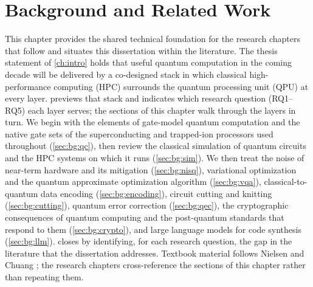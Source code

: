 \chapter{Background and Related Work}\label{ch:background}


This chapter provides the shared technical foundation for the research chapters that follow and situates this dissertation within the literature. The thesis statement of \cref{ch:intro} holds that useful quantum computation in the coming decade will be delivered by a co-designed stack in which classical high-performance computing (HPC) surrounds the quantum processing unit (QPU) at every layer.  previews that stack and indicates which research question (RQ1--RQ5) each layer serves; the sections of this chapter walk through the layers in turn. We begin with the elements of gate-model quantum computation and the native gate sets of the superconducting and trapped-ion processors used throughout (\cref{sec:bg:qc}), then review the classical simulation of quantum circuits and the HPC systems on which it runs (\cref{sec:bg:sim}). We then treat the noise of near-term hardware and its mitigation (\cref{sec:bg:nisq}), variational optimization and the quantum approximate optimization algorithm (\cref{sec:bg:vqa}), classical-to-quantum data encoding (\cref{sec:bg:encoding}), circuit cutting and knitting (\cref{sec:bg:cutting}), quantum error correction (\cref{sec:bg:qec}), the cryptographic consequences of quantum computing and the post-quantum standards that respond to them (\cref{sec:bg:crypto}), and large language models for code synthesis (\cref{sec:bg:llm}).  closes by identifying, for each research question, the gap in the literature that the dissertation addresses. Textbook material follows Nielsen and Chuang \cite{nielsen2010qcqi}; the research chapters cross-reference the sections of this chapter rather than repeating them.


